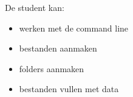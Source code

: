 De student kan:

\begin{itemize}
\item werken met de command line
\item bestanden aanmaken
\item folders aanmaken
\item bestanden vullen met data
\end{itemize}

